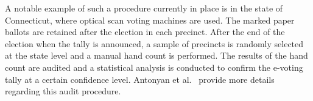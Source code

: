 A notable example of such a procedure currently in place is in the
state of Connecticut, where optical scan voting machines are used. The
marked paper ballots are retained after the election in each precinct.
After the end of the election when the tally is announced, a sample of
precincts is randomly selected at the state level and a manual hand
count is performed. The results of the hand count are audited and a
statistical analysis is conducted to confirm the e-voting tally at a
certain confidence level. Antonyan et al.~\cite{antonyan2009state}
provide more details regarding this audit procedure.

